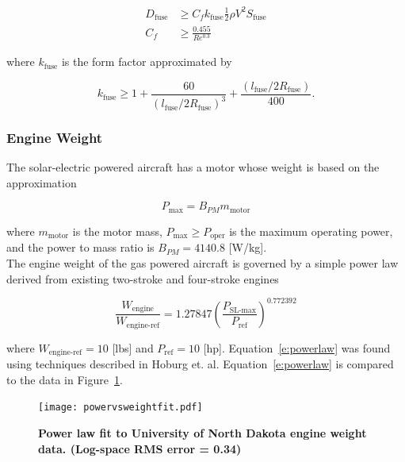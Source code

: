 \begin{align}
    \label{e:fusedrag}
    D_{\text{fuse}} &\geq C_f k_{\text{fuse}} \frac{1}{2} \rho V^2 S_{\text{fuse}} \\
    C_f &\geq \frac{0.455}{Re^{0.3}}
\end{align}

where $k_{\text{fuse}}$ is the form factor approximated by\cite{raymer}

\begin{equation}
    \label{e:fuseform}
    k_{\text{fuse}} \geq 1 + \frac{60}{(l_{\text{fuse}}/2R_{\text{fuse}})^3} + \frac{(l_{\text{fuse}}/2R_{\text{fuse}})}{400}.
\end{equation}

\subsubsection{Engine Weight}

The solar-electric powered aircraft has a motor whose weight is based on the approximation\cite{electricengine}

\begin{equation}
    \label{e:electricengine}
    P_{\text{max}} = B_{PM} m_{\text{motor}}
\end{equation}

where $m_{\text{motor}}$ is the motor mass, $P_{\text{max}} \geq P_{\text{oper}}$ is the maximum operating power, and the power to mass ratio is $B_{PM} = 4140.8$ [W/kg]. \\

The engine weight of the gas powered aircraft is governed by a simple power law derived from existing two-stroke and four-stroke engines\cite{gasengine}

\begin{equation}
    \label{e:powerlaw}
    \frac{W_{\text{engine}}}{W_{\text{engine-ref}}} = 1.27847 \left(\frac{P_{\text{SL-max}}}{P_{\text{ref}}} \right)^{0.772392}
\end{equation}

where $W_{\text{engine-ref}} = 10$ [lbs] and $P_{\text{ref}} = 10$ [hp].  Equation~\eqref{e:powerlaw} was found using techniques described in Hoburg et. al\cite{fitting}. Equation~\eqref{e:powerlaw} is compared to the data in Figure~\ref{f:powervsweightfit}.

\begin{figure}[H]
	\begin{center}
	\texttt{[image: powervsweightfit.pdf]}
    \caption{\textbf{Power law fit to University of North Dakota engine weight data\cite{gasengine}. (Log-space RMS error = 0.34)}}
	\label{f:powervsweightfit}
	\end{center}
\end{figure}

